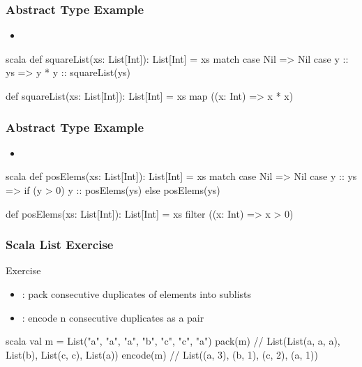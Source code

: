 \documentclass[dvipsnames]{beamer}
\theoremstyle{plain}
\begin{document}
\begin{frame}[fragile]
  \frametitle{Abstract Type Example}

  \begin{example}
    \begin{itemize}
      \item {}
    \end{itemize}

    \pause
    \begin{pygments}{scala}
def squareList(xs: List[Int]): List[Int] =
    xs match {
        case Nil => Nil
        case y :: ys => y * y :: squareList(ys)
    }

def squareList(xs: List[Int]): List[Int] =
    xs map ((x: Int) => x * x)
    \end{pygments}
  \end{example}
\end{frame}

\begin{frame}[fragile]
  \frametitle{Abstract Type Example}

  \begin{example}
    \begin{itemize}
      \item {}
    \end{itemize}

    \pause
    \begin{pygments}{scala}
def posElems(xs: List[Int]): List[Int] =
    xs match {
        case Nil => Nil
        case y :: ys => if (y > 0) y :: posElems(ys)
                        else posElems(ys)
    }

def posElems(xs: List[Int]): List[Int] =
    xs filter ((x: Int) => x > 0)
    \end{pygments}
  \end{example}
\end{frame}

\begin{frame}[fragile]
  \frametitle{Scala List Exercise}

  \begin{block}{Exercise}
    \begin{itemize}
      \item {}: pack consecutive duplicates of elements
        into sublists
      \item {}: encode n consecutive duplicates as a pair
    \end{itemize}
  \end{block}

  \begin{example}
    \begin{pygments}{scala}
val m = List("a", "a", "a", "b", "c", "c", "a")
pack(m)
// List(List(a, a, a), List(b), List(c, c), List(a))
encode(m)
// List((a, 3), (b, 1), (c, 2), (a, 1))
    \end{pygments}
  \end{example}
\end{frame}
\end{document}
